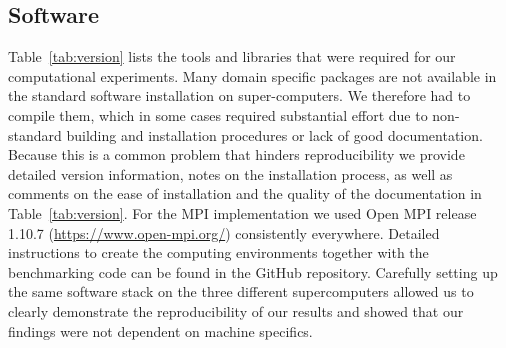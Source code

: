 \subsection{Software}
\label{sec:software}

Table~\ref{tab:version} lists the tools and libraries that were required for our computational experiments.  Many domain specific packages are not available in the standard software installation on super-computers.
We therefore had to compile them, which in some cases required substantial effort due to non-standard building and installation procedures or lack of good documentation.
Because this is a common problem that hinders reproducibility we provide detailed version information, notes on the installation process, as well as comments on the ease of installation and the quality of the documentation in Table~\ref{tab:version}.
For the MPI implementation we used Open MPI release 1.10.7  (\url{https://www.open-mpi.org/}) consistently everywhere.
Detailed instructions to create the computing environments together with the benchmarking code can be found in the GitHub repository.
Carefully setting up the same software stack on the three different supercomputers allowed us to clearly demonstrate the reproducibility of our results and showed that our findings were not dependent on machine specifics.


